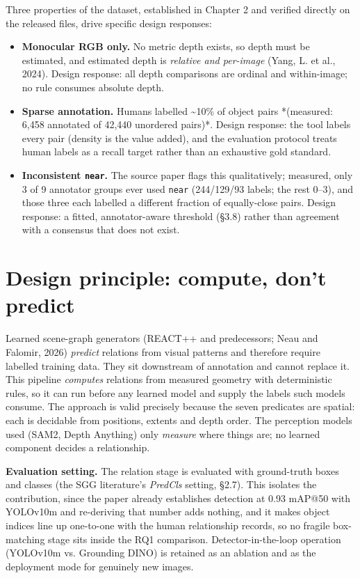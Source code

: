 Three properties of the dataset, established in Chapter 2 and verified directly on the released files, drive specific design responses:

\begin{itemize}
\item \textbf{Monocular RGB only.} No metric depth exists, so depth must be estimated,
and estimated depth is \textit{relative and per-image} (Yang, L. et al., 2024). Design response: all depth comparisons are ordinal and within-image; no rule consumes absolute depth.
\item \textbf{Sparse annotation.} Humans labelled \textasciitilde{}10\% of object pairs *(measured:
6,458 annotated of 42,440 unordered pairs)*. Design response: the tool labels every pair (density is the value added), and the evaluation protocol treats human labels as a recall target rather than an exhaustive gold standard.
\item \textbf{Inconsistent \texttt{near}.} The source paper flags this qualitatively; measured,
only 3 of 9 annotator groups ever used \texttt{near} (244/129/93 labels; the rest 0--3), and those three each labelled a different fraction of equally-close pairs. Design response: a fitted, annotator-aware threshold (\S3.8) rather than agreement with a consensus that does not exist.
\end{itemize}

\section{Design principle: compute, don't predict}

Learned scene-graph generators (REACT++ and predecessors; Neau and Falomir, 2026) \textit{predict} relations from visual patterns and therefore require labelled training data. They sit downstream of annotation and cannot replace it. This pipeline \textit{computes} relations from measured geometry with deterministic rules, so it can run before any learned model and supply the labels such models consume. The approach is valid precisely because the seven predicates are spatial: each is decidable from positions, extents and depth order. The perception models used (SAM2, Depth Anything) only \textit{measure} where things are; no learned component decides a relationship.

\textbf{Evaluation setting.} The relation stage is evaluated with ground-truth boxes and classes (the SGG literature's \textit{PredCls} setting, \S2.7). This isolates the contribution, since the paper already establishes detection at 0.93 mAP@50 with YOLOv10m and re-deriving that number adds nothing, and it makes object indices line up one-to-one with the human relationship records, so no fragile box-matching stage sits inside the RQ1 comparison. Detector-in-the-loop operation (YOLOv10m vs. Grounding DINO) is retained as an ablation and as the deployment mode for genuinely new images.

